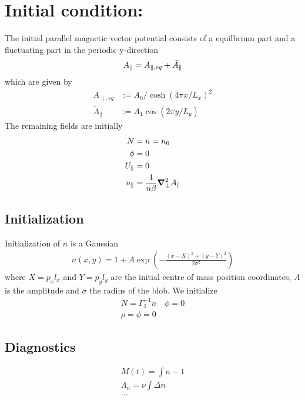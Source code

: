 \section{Initial condition:}
The initial parallel magnetic vector potential consists of a equilbrium part and 
a fluctuating part in the periodic y-direction
\begin{align}
 A_\parallel = A_{\parallel,eq} + \tilde{A}_\parallel
\end{align}
which are given by
\begin{align}
 A_{\parallel,eq}   &:=  A_0 / \cosh{( 4  \pi x / L_x )}^2\\
 \tilde{A}_\parallel&:=A_1\cos{(2 \pi y/L_y)} 
\end{align}
The remaining fields are initially 
\begin{align}
 N&=n =n_0 \\
 \phi &= 0 \\
  U_\parallel&=0 \\
  u_\parallel &= \frac{1}{n  \beta }{\boldsymbol{\nabla}}^2_{\perp} A_\parallel
\end{align}

\subsection{Initialization}
Initialization of $n$ is a Gaussian 
\begin{align}
    n(x,y) = 1 + A\exp\left( -\frac{(x-X)^2 + (y-Y)^2}{2\sigma^2}\right)
    \label{}
\end{align}
where $X = p_x l_x$ and $Y=p_yl_y$ are the initial centre of mass position coordinates, $A$ is the amplitude and $\sigma$ the
radius of the blob.
We initialize 
\begin{align}
    N = \Gamma_1^{-1} n \quad \phi = 0 \\
    \rho = \phi = 0
    \label{}
\end{align}
\subsection{Diagnostics}
\begin{align}
    M(t) = \int n-1 \\
    \Lambda_n = \nu \int \Delta n  \\
    ...
    \label{}
\end{align}
